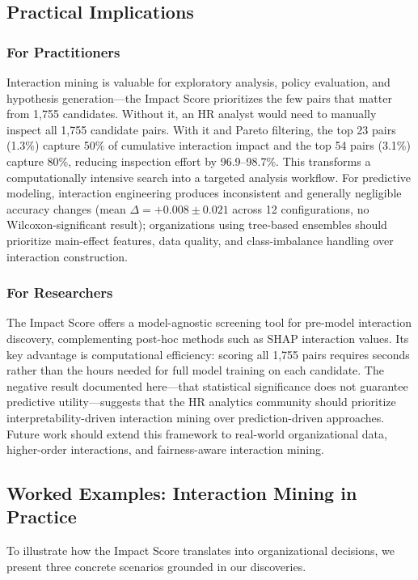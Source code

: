 \documentclass[conference]{IEEEtran}
\begin{document}
\subsection{Practical Implications}

\subsubsection*{For Practitioners}
Interaction mining is valuable for exploratory analysis, policy evaluation, and hypothesis generation---the Impact Score prioritizes the few pairs that matter from 1,755 candidates. Without it, an HR analyst would need to manually inspect all 1,755 candidate pairs. With it and Pareto filtering, the top 23 pairs (1.3\%) capture 50\% of cumulative interaction impact and the top 54 pairs (3.1\%) capture 80\%, reducing inspection effort by 96.9--98.7\%. This transforms a computationally intensive search into a targeted analysis workflow. For predictive modeling, interaction engineering produces inconsistent and generally negligible accuracy changes (mean $\Delta=+0.008\pm0.021$ across 12 configurations, no Wilcoxon-significant result); organizations using tree-based ensembles should prioritize main-effect features, data quality, and class-imbalance handling over interaction construction.

\subsubsection*{For Researchers}
The Impact Score offers a model-agnostic screening tool for pre-model interaction discovery, complementing post-hoc methods such as SHAP interaction values. Its key advantage is computational efficiency: scoring all 1,755 pairs requires seconds rather than the hours needed for full model training on each candidate. The negative result documented here---that statistical significance does not guarantee predictive utility---suggests that the HR analytics community should prioritize interpretability-driven interaction mining over prediction-driven approaches. Future work should extend this framework to real-world organizational data, higher-order interactions, and fairness-aware interaction mining.

\subsection{Worked Examples: Interaction Mining in Practice}

To illustrate how the Impact Score translates into organizational decisions, we present three concrete scenarios grounded in our discoveries.
\end{document}
